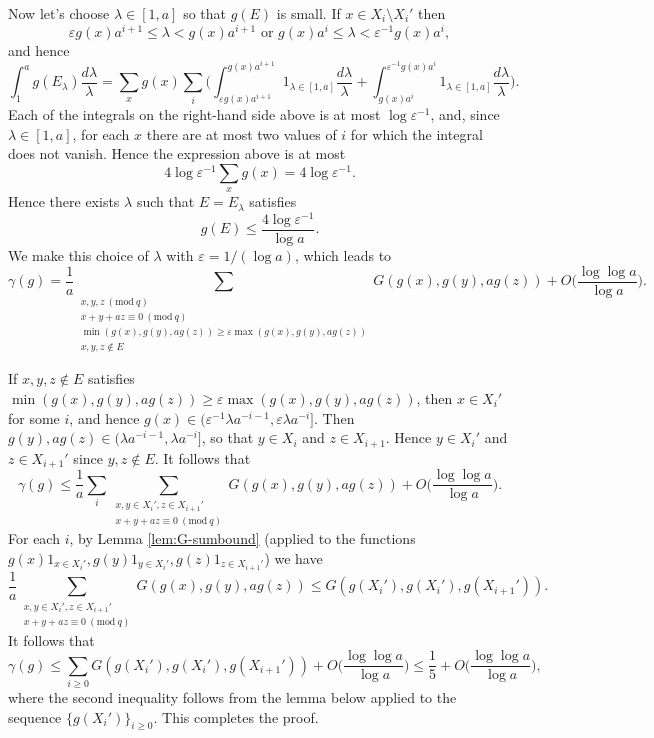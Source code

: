 \documentclass[12pt, notitlepage]{amsart}
\numberwithin{equation}{section}
\newcommand{\eps}{\varepsilon}
\newcommand{\Mod}[1]{\ (\mathrm{mod}\ #1)}
\theoremstyle{remark}
\theoremstyle{definition}
\theoremstyle{remark}
\numberwithin{equation}{section}
\begin{document}
Now let's choose $\lambda \in [1,a]$ so that $g(E)$ is small. If $x \in X_i\setminus X_i'$ then
$$
\eps g(x)a^{i+1} \leq \lambda < g(x)a^{i+1}\text{ or }g(x)a^i \leq \lambda < \eps^{-1} g(x)a^i,
$$
and hence
$$
\int_1^a g(E_\lambda) \frac{d\lambda}{\lambda} = \sum_x g(x) \sum_i \Big(\int_{\eps g(x)a^{i+1}}^{g(x)a^{i+1}} 1_{\lambda \in [1,a]}\frac{d\lambda}{\lambda} + \int_{g(x)a^i}^{\eps^{-1}g(x)a^i} 1_{\lambda \in [1,a]}\frac{d\lambda}{\lambda}\Big).
$$
Each of the integrals on the right-hand side above is at most $\log\eps^{-1}$, and, since $\lambda \in [1,a]$, for each $x$ there are at most two values of $i$ for which the integral does not vanish. Hence the expression above is at most
$$
4\log \eps^{-1} \sum_x g(x) = 4\log \eps^{-1}.
$$
Hence there exists $\lambda$ such that $E = E_\lambda$ satisfies
$$
g(E) \leq \frac{4\log \eps^{-1}}{\log a}.
$$
We make this choice of $\lambda$ with $\eps = 1/(\log a)$, which leads to
$$
\gamma(g) = \frac{1}{a} \sum_{\substack{x,y,z\Mod{q}\\ x+y+az\equiv 0\Mod{q} \\ \min(g(x), g(y), ag(z)) \geq \eps \max(g(x),g(y),ag(z)) \\ x,y,z\notin E}} G(g(x), g(y), ag(z)) + O\Big(\frac{\log\log a}{\log a}\Big).
$$

If $x,y,z \notin E$ satisfies $\min(g(x), g(y), ag(z)) \geq \eps \max(g(x),g(y),ag(z))$, then $x \in X_i'$ for some $i$, and hence $g(x) \in (\eps^{-1}\lambda a^{-i-1}, \eps\lambda a^{-i}]$. Then $g(y), ag(z) \in (\lambda a^{-i-1}, \lambda a^{-i}]$, so that $y \in X_i$ and $z \in X_{i+1}$. Hence $y \in X_i'$ and $z \in X_{i+1}'$ since $y,z \notin E$. It follows that
$$
\gamma(g) \leq \frac{1}{a} \sum_i \sum_{\substack{x,y \in X_i', z \in X_{i+1}'\\ x+y+az\equiv 0\Mod{q}}} G(g(x), g(y), ag(z)) + O\Big(\frac{\log\log a}{\log a}\Big).
$$
For each $i$, by Lemma \ref{lem:G-sumbound} (applied to the functions $g(x)1_{x \in X_i'}, g(y)1_{y \in X_i'}, g(z)1_{z\in X_{i+1}'}$) we have
$$
\frac{1}{a} \sum_{\substack{x,y \in X_i', z \in X_{i+1}'\\ x+y+az\equiv 0\Mod{q}}} G(g(x), g(y), ag(z))  \leq G(g(X_i'), g(X_i'), g(X_{i+1}')).
$$
It follows that
$$
\gamma(g) \leq \sum_{i \geq 0} G(g(X_i'), g(X_i'), g(X_{i+1}')) + O\Big(\frac{\log\log a}{\log a}\Big) \leq \frac{1}{5} + O\Big(\frac{\log\log a}{\log a}\Big),
$$
where the second inequality follows from the lemma below applied to the sequence $\{g(X_i')\}_{i\geq 0}$. This completes the proof.
\end{document}
